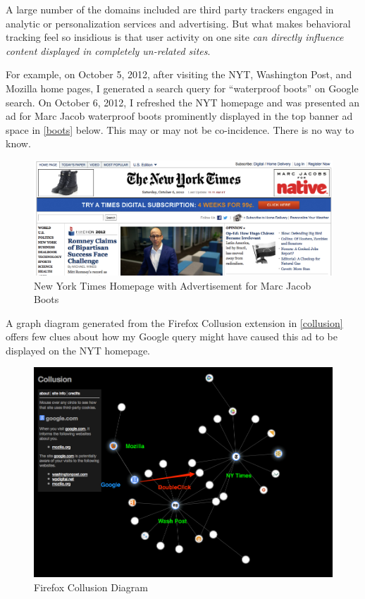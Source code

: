 A large number of the domains included are third party trackers engaged in analytic or personalization services and advertising. But what makes behavioral tracking feel so insidious is that user activity on one site \emph{can directly influence content displayed in completely un-related sites}. 

For example, on October 5, 2012, after visiting the NYT, Washington Post, and Mozilla home pages, I generated a search query for ``waterproof boots'' on Google search. On October 6, 2012, I refreshed the NYT homepage and was presented an ad for Marc Jacob waterproof boots prominently displayed in the top banner ad space in  \autoref{boots}  below. This may or may not be co-incidence. There is no way to know.


\begin{figure}
\centerline{
  \includegraphics[scale=.75]{chapter2.tex/Image2}
  }
\caption{New York Times Homepage with Advertisement for Marc Jacob Boots}\label{boots}
\end{figure}


A graph diagram generated from the Firefox Collusion extension in  \autoref{collusion}  offers few clues about how my Google query might have caused this ad to be displayed on the NYT homepage. 


\begin{figure}
\centerline{
  \includegraphics[scale=.75]{chapter2.tex/Image3}
  }
\caption{Firefox Collusion Diagram}
\label{collusion}
\end{figure}



